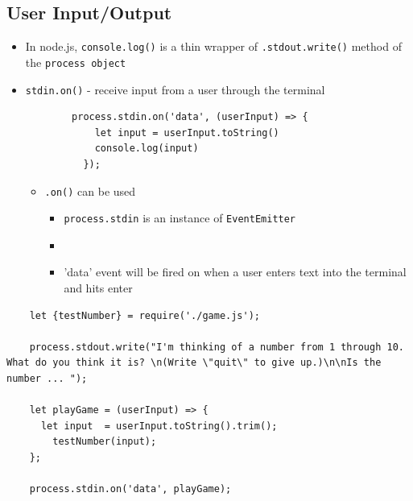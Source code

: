 \documentclass[12pt]{article}
\begin{document}
\subsection{User Input/Output}
\begin{itemize}
    \item In node.js, \texttt{console.log()} is a thin wrapper of \texttt{.stdout.write()} method of the \texttt{process object}
    \item \texttt{stdin.on()} - receive input from a user through the terminal

    \begin{lstlisting}
        process.stdin.on('data', (userInput) => {
            let input = userInput.toString()
            console.log(input)
          });
    \end{lstlisting}

    \begin{itemize}
        \item\texttt{.on()} can be used
        \begin{itemize}
            \item \texttt{process.stdin} is an instance of \texttt{EventEmitter}
            \item \item 'data' event will be fired on when a user enters text into the terminal and hits enter
        \end{itemize}
    \end{itemize}
\end{itemize}

\begin{lstlisting}
    let {testNumber} = require('./game.js');

    process.stdout.write("I'm thinking of a number from 1 through 10. What do you think it is? \n(Write \"quit\" to give up.)\n\nIs the number ... ");

    let playGame = (userInput) => {
      let input  = userInput.toString().trim();
        testNumber(input);
    };

    process.stdin.on('data', playGame);
\end{lstlisting}
\end{document}
